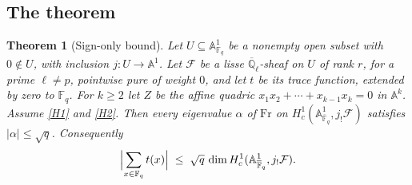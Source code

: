 \documentclass[11pt]{amsbook}
\theoremstyle{plain}
\newtheorem{theorem}{Theorem}[section]
\theoremstyle{definition}
\theoremstyle{remark}
\numberwithin{equation}{section}
\numberwithin{figure}{chapter}
\numberwithin{table}{chapter}
\newcommand{\Q}{\mathbb{Q}}
\newcommand{\F}{\mathbb{F}}
\newcommand{\Fr}{\mathrm{Fr}}
\newcommand{\Fb}{\overline{\F}_q}
\newcommand{\cF}{\mathcal{F}}
\begin{document}
\subsection{The theorem}

\begin{theorem}[Sign-only bound]\label{thm:sign}
Let $U \subseteq \mathbb{A}^1_{\F_q}$ be a nonempty open subset
with $0 \notin U$, with inclusion $j\colon U\to\mathbb A^1$. Let
$\cF$ be a lisse $\overline{\Q}_\ell$-sheaf on $U$ of rank $r$, for
a prime $\ell\ne p$, pointwise pure of weight $0$, and let $t$ be its
trace function, extended by zero to $\F_q$. For $k\ge2$ let $Z$ be the affine
quadric $x_1x_2 + \cdots + x_{k-1}x_k = 0$ in $\mathbb{A}^k$.
Assume \ref{H1} and \ref{H2}. Then every eigenvalue $\alpha$ of
$\Fr$ on $H^1_c(\mathbb{A}^1_{\Fb}, j_!\cF)$ satisfies
$|\alpha| \le \sqrt q$. Consequently
\[
  \Bigl|\sum_{x\in\F_q} t(x)\Bigr| \;\le\;
  \sqrt q\,\dim H^1_c(\mathbb{A}^1_{\Fb}, j_!\cF).
\]
\end{theorem}
\end{document}
